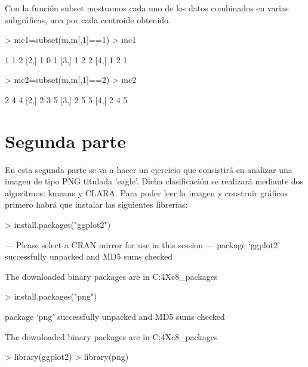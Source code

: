 \documentclass [a4paper] {article}
\begin{document}
Con la función subset mostramos cada uno de los datos combinados en varias subgráficas, una por cada centroide obtenido.

\begin{Schunk}
\begin{Sinput}
> mc1=subset(m,m[,1]==1)
> mc1
\end{Sinput}
\begin{Soutput}
     [,1] [,2] [,3]
[1,]    1    1    2
[2,]    1    0    1
[3,]    1    2    2
[4,]    1    2    1
\end{Soutput}
\begin{Sinput}
> mc2=subset(m,m[,1]==2)
> mc2
\end{Sinput}
\begin{Soutput}
     [,1] [,2] [,3]
[1,]    2    4    4
[2,]    2    3    5
[3,]    2    5    5
[4,]    2    4    5
\end{Soutput}
\end{Schunk}

\section{Segunda parte}

En esta segunda parte se va a hacer un ejercicio que consistirá en analizar una imagen de tipo PNG titulada 'eagle'. Dicha clasificación se realizará mediante dos algoritmos: kmeans y CLARA. Para poder leer la imagen y construir gráficos primero habrá que instalar las siguientes librerías:

\begin{Schunk}
\begin{Sinput}
> install.packages("ggplot2")
\end{Sinput}
\begin{Soutput}
--- Please select a CRAN mirror for use in this session ---
package ‘ggplot2’ successfully unpacked and MD5 sums checked

The downloaded binary packages are in
	C:\Users\Javier\AppData\Local\Temp\RtmpAZ4Xc8\downloaded_packages
\end{Soutput}
\begin{Sinput}
> install.packages("png")
\end{Sinput}
\begin{Soutput}
package ‘png’ successfully unpacked and MD5 sums checked

The downloaded binary packages are in
	C:\Users\Javier\AppData\Local\Temp\RtmpAZ4Xc8\downloaded_packages
\end{Soutput}
\begin{Sinput}
> library(ggplot2) 
> library(png)
\end{Sinput}
\end{Schunk}
\end{document}
